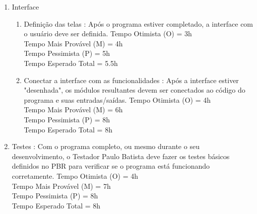 \documentclass[12pt,a4paper,final]{report}
\begin{document}
\begin{enumerate}
\item Interface
\begin{enumerate}
\item Definição das telas : Após o programa estiver completado, a interface com o usuário deve ser definida.
Tempo Otimista (O) = 3h\\
Tempo Mais Provável (M) = 4h\\
Tempo Pessimista (P) = 5h\\
Tempo Esperado Total = 5.5h
\item Conectar a interface com as funcionalidades : Após a interface estiver "desenhada", os módulos resultantes devem ser conectados ao código do programa e suas entradas/saídas.
Tempo Otimista (O) = 4h\\
Tempo Mais Provável (M) = 6h\\
Tempo Pessimista (P) = 8h\\
Tempo Esperado Total = 8h
\end{enumerate}

\item Testes : Com o programa completo, ou mesmo durante o seu desenvolvimento, o Testador Paulo Batista deve fazer os testes básicos definidos no PBR para verificar se o programa está funcionando corretamente.
Tempo Otimista (O) = 4h\\
Tempo Mais Provável (M) = 7h\\
Tempo Pessimista (P) = 8h\\
Tempo Esperado Total = 8h

\end{enumerate}
\end{document}
